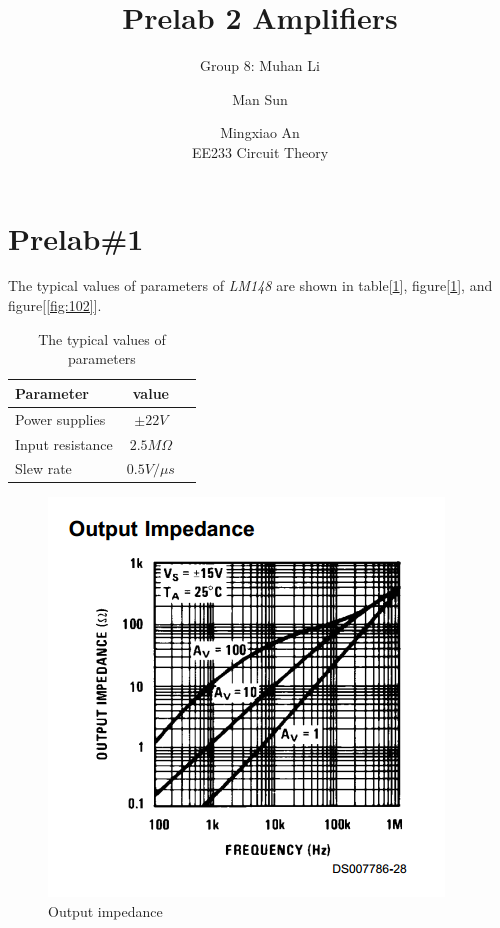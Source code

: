 \documentclass{IEEEtran}
\title{Prelab 2 Amplifiers}
\author{Group 8: Muhan Li \and Man Sun \and Mingxiao An \\ EE233 Circuit Theory}
\begin{document}
	
	\maketitle
	
	\section{\textbf{Prelab\#1}}
	The typical values of parameters of \textit{LM148} are shown in table[\ref{tab:pl1}], figure[\ref{fig:101}], and figure[\ref{fig:102}].
	
	\begin{table}[!htbp]
		\centering
		\caption{The typical values of parameters}
		\begin{tabular}{lcl}
			\toprule
			Parameter & value & \\
			\midrule
			Power supplies & $\pm22\si{V}$ & \\
			Input resistance & $2.5\si{M\Omega}$ & \\
			Slew rate & $0.5\si{V/\mu s}$ & \\
			\bottomrule
		\end{tabular}
		\label{tab:pl1}
	\end{table}
	
	\begin{figure}[!htbp]
		\centering
		\begin{framed}
			\includegraphics[width=\linewidth]{images/1_1.PNG}
			\caption{Output impedance}
		\end{framed}
		\label{fig:101}
	\end{figure}
	
\end{document}
